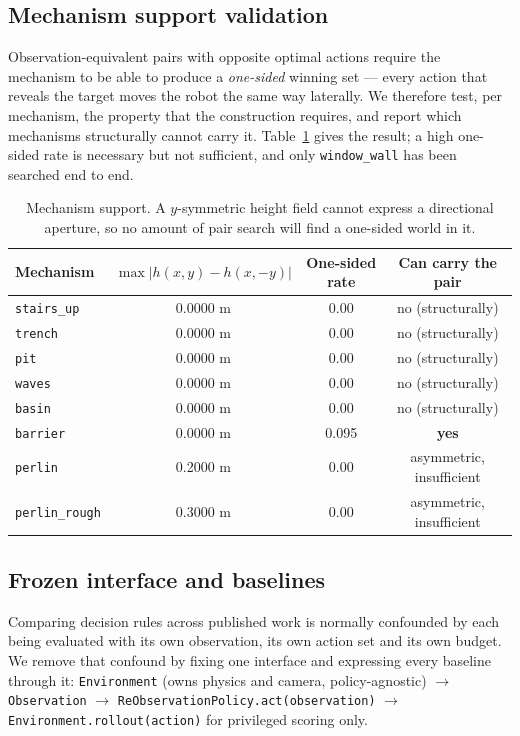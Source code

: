 \documentclass[utf8]{FrontiersinHarvard}
\begin{document}
\subsection{Mechanism support validation}

Observation-equivalent pairs with opposite optimal actions require the mechanism to be
able to produce a \emph{one-sided} winning set --- every action that reveals the target
moves the robot the same way laterally. We therefore test, per mechanism, the property
that the construction requires, and report which mechanisms structurally cannot carry
it. Table~\ref{tab:audit} gives the result; a high one-sided rate is necessary but not
sufficient, and only \texttt{window\_wall} has been searched end to end.

\begin{table}[h]
\caption{Mechanism support. A $y$-symmetric height field cannot express a directional
aperture, so no amount of pair search will find a one-sided world in it.}
\label{tab:audit}
\begin{tabular}{lccc}
\toprule
Mechanism & $\max|h(x,y)-h(x,-y)|$ & One-sided rate & Can carry the pair \\
\midrule
\texttt{stairs\_up} & 0.0000 m & 0.00 & no (structurally) \\
\texttt{trench} & 0.0000 m & 0.00 & no (structurally) \\
\texttt{pit} & 0.0000 m & 0.00 & no (structurally) \\
\texttt{waves} & 0.0000 m & 0.00 & no (structurally) \\
\texttt{basin} & 0.0000 m & 0.00 & no (structurally) \\
\texttt{barrier} & 0.0000 m & 0.095 & \textbf{yes} \\
\texttt{perlin} & 0.2000 m & 0.00 & asymmetric, insufficient \\
\texttt{perlin\_rough} & 0.3000 m & 0.00 & asymmetric, insufficient \\
\bottomrule
\end{tabular}
\end{table}

\subsection{Frozen interface and baselines}

Comparing decision rules across published work is normally confounded by each being
evaluated with its own observation, its own action set and its own budget. We remove
that confound by fixing one interface and expressing every baseline through it:
\texttt{Environment} (owns physics and camera, policy-agnostic) $\rightarrow$
\texttt{Observation} $\rightarrow$ \texttt{ReObservationPolicy.act(observation)}
$\rightarrow$ \texttt{Environment.rollout(action)} for privileged scoring only.
\end{document}
